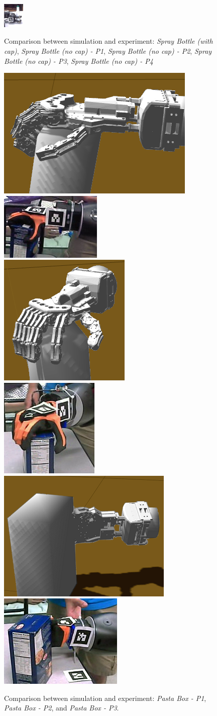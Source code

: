 \begin{figure}[!!hbt]
\begin{center}
{\includegraphics[width=0.09\textwidth]{images/ssoch/fig/spray_p4}\label{spray_p4}}
        \caption{Comparison between simulation and experiment: \emph{Spray Bottle (with cap)}, \emph{Spray Bottle (no cap) - P1}, \emph{Spray Bottle (no cap) - P2}, \emph{Spray Bottle (no cap) - P3}, \emph{Spray Bottle (no cap) - P4}}
        \label{spray}
        \end{center}
\end{figure}


\begin{figure}[!!hbt]
\begin{center}
{\includegraphics[height=0.12\textwidth]     {images/ssoch/fig/kh_changes/softhand_p1_simu01}}%
{\includegraphics[height=0.12\textwidth]     {images/ssoch/fig/kh_changes/softhand_p1_grasp}}
{\includegraphics[height=0.12\textwidth]     {images/ssoch/fig/kh_changes/softhand_p2_simu01}}%
{\includegraphics[height=0.12\textwidth]     {images/ssoch/fig/kh_changes/softhand_p2_grasp}}
{\includegraphics[height=0.12\textwidth]     {images/ssoch/fig/kh_changes/softhand_p3_simu01}}%
{\includegraphics[height=0.12\textwidth]     {images/ssoch/fig/kh_changes/softhand_p3_grasp}}
        \caption{Comparison between simulation and experiment: {\em Pasta Box - P1}, {\em Pasta Box - P2}, and {\em Pasta Box - P3}.}
        \label{pasta_box}
        \end{center}
\end{figure}


